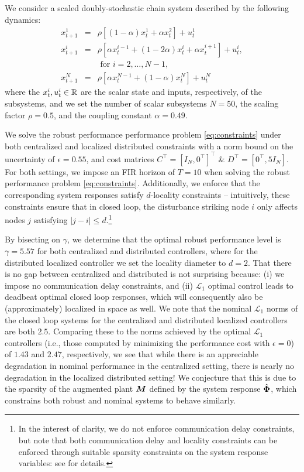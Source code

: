 We consider a scaled doubly-stochastic chain system described by the following dynamics:
\begin{equation}\label{eq:chain}
\begin{array}{rcl}
x^1_{t+1} &=& \rho\left[(1-\alpha)x^1_t + \alpha x^2_t\right] + u^1_t\\
x^i_{t+1} &=& \rho\left[\alpha x^{i-1}_t + (1-2\alpha)x^i_t + \alpha x^{i+1}_t\right] + u^i_t,\\
&& \text{ for $i=2,\dots,N-1$,} \\
 x^N_{t+1} &=& \rho\left[\alpha x^{N-1}_t + (1-\alpha)x^N_t\right] + u^N_t
 \end{array}
\end{equation}
where the $x^i_t, u^i_t \in \mathbb{R}$ are the scalar state and inputs, respectively, of the subsystems, and we set the number of scalar subsystems $N=50$, the scaling factor $\rho = 0.5$, and the coupling constant $\alpha = 0.49$.  

We solve the robust performance performance problem \eqref{eq:constraints} under both centralized and localized distributed constraints with a norm bound on the uncertainty of $\epsilon = 0.55$, and cost matrices $C^\top = [I_N, 0^\top]^\top$ \& $D^\top = [0^\top, 5I_N]$.  For both settings, we impose an FIR horizon of $T=10$ when solving the robust performance problem \eqref{eq:constraints}.  Additionally, we enforce that the corresponding system responses satisfy $d$-locality constraints -- intuitively, these constraints ensure that in closed loop, the disturbance striking node $i$ only affects nodes $j$ satisfying $|j-i|\leq d$.\footnote{In the interest of clarity, we do not enforce communication delay constraints, but note that both communication delay and locality constraints can be enforced through suitable sparsity constraints on the system response variables: see \cite{anderson2019system} for details.}

By bisecting on $\gamma$, we determine that the optimal robust performance level is $\gamma = 5.57$ for both centralized and distributed controllers, where for the distributed localized controller we set the locality diameter to $d=2$.  That there is no gap between centralized and distributed is not surprising because: (i) we impose no communication delay constraints, and (ii) $\mathcal{L}_1$ optimal control leads to deadbeat optimal closed loop responses, which will consequently also be (approximately) localized in space as well.  We note that the nominal $\mathcal{L}_1$ norms of the closed loop systems for the centralized and distributed localized controllers are both $2.5$.  Comparing these to the norms achieved by the optimal $\mathcal{L}_1$ controllers (i.e., those computed by minimizing the performance cost with $\epsilon = 0$) of $1.43$ and $2.47$, respectively, we see that while there is an appreciable degradation in nominal performance in the centralized setting, there is nearly no degradation in the localized distributed setting!  We conjecture that this is due to the sparsity of the augmented plant $\boldsymbol{M}$ defined by the system response $\hat{\boldsymbol{\Phi}}$, which constrains both robust and nominal systems to behave similarly.


